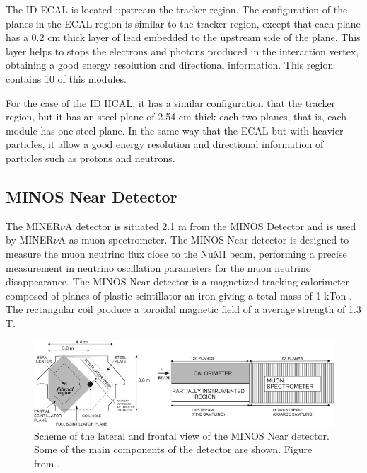 \begin{itemize}
    The ID ECAL is located upstream the tracker region. The configuration of the planes in the ECAL region is similar to the tracker region, except that each plane has a 0.2 cm thick layer of lead embedded to the upstream side of the plane. This layer helps to stops the electrons and photons produced in the interaction vertex, obtaining a good energy resolution and directional information. This region contains 10 of this modules. 

    For the case of the ID HCAL, it has a similar configuration that the tracker region, but it has an steel plane of 2.54 cm thick each two planes, that is, each module has one steel plane. In the same way that the ECAL but with heavier particles, it allow a good energy resolution and directional information of particles such as protons and neutrons. 
    
\end{itemize}

\subsection{MINOS Near Detector}
\label{Cap:MnvExp:MnvDetector:MINOS}

The MINER$\nu$A detector is situated 2.1 m from the MINOS Detector and is used by MINER$\nu$A as muon spectrometer. The MINOS Near detector is designed to measure the muon neutrino flux close to the NuMI beam, performing a precise measurement in neutrino oscillation parameters for the muon neutrino disappearance. The MINOS Near detector is a magnetized tracking calorimeter composed of planes of plastic scintillator an iron giving a total mass of 1 kTon \cite{MINOSpaper}. The rectangular coil produce a toroidal magnetic field of a average strength of 1.3 T.

\begin{figure}
    \centering
    \includegraphics[scale=0.9]{Figures/Chapter2/MINOSNDScheme.jpg}
    \caption{Scheme of the lateral and frontal view of the MINOS Near detector. Some of the main components of the detector are shown. Figure from \cite{ALIAGA2014130}.}
    \label{fig:MnvExp:MnvDetector:SchemeMINOSND}
\end{figure}

